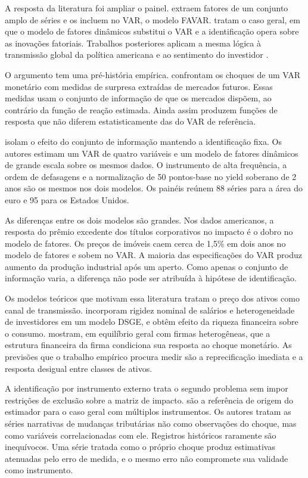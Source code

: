 \documentclass[preprint,authoryear,review,12pt]{elsarticle}
\begin{document}
A resposta da literatura foi ampliar o painel. \cite{bernanke} extraem fatores de um conjunto amplo de séries e os incluem no VAR, o modelo FAVAR. \cite{STOCK2016415} tratam o caso geral, em que o modelo de fatores dinâmicos substitui o VAR e a identificação opera sobre as inovações fatoriais. Trabalhos posteriores aplicam a mesma lógica à transmissão global da política americana \cite{miranda} e ao sentimento do investidor \cite{lutz}.

O argumento tem uma pré-história empírica. \cite{bagliano1998} confrontam os choques de um VAR monetário com medidas de surpresa extraídas de mercados futuros. Essas medidas usam o conjunto de informação de que os mercados dispõem, ao contrário da função de reação estimada. Ainda assim produzem funções de resposta que não diferem estatisticamente das do VAR de referência.

\cite{alessi} isolam o efeito do conjunto de informação mantendo a identificação fixa. Os autores estimam um VAR de quatro variáveis e um modelo de fatores dinâmicos de grande escala sobre os mesmos dados. O instrumento de alta frequência, a ordem de defasagens e a normalização de 50 pontos-base no yield soberano de 2 anos são os mesmos nos dois modelos. Os painéis reúnem 88 séries para a área do euro e 95 para os Estados Unidos.

As diferenças entre os dois modelos são grandes. Nos dados americanos, a resposta do prêmio excedente dos títulos corporativos no impacto é o dobro no modelo de fatores. Os preços de imóveis caem cerca de 1,5\% em dois anos no modelo de fatores e sobem no VAR. A maioria das especificações do VAR produz aumento da produção industrial após um aperto. Como apenas o conjunto de informação varia, a diferença não pode ser atribuída à hipótese de identificação.

Os modelos teóricos que motivam essa literatura tratam o preço dos ativos como canal de transmissão. \cite{castelnuovo} incorporam rigidez nominal de salários e heterogeneidade de investidores em um modelo DSGE, e obtêm efeito da riqueza financeira sobre o consumo. \cite{Cooley} mostram, em equilíbrio geral com firmas heterogêneas, que a estrutura financeira da firma condiciona sua resposta ao choque monetário. As previsões que o trabalho empírico procura medir são a reprecificação imediata e a resposta desigual entre classes de ativos.

A identificação por instrumento externo trata o segundo problema sem impor restrições de exclusão sobre a matriz de impacto. \cite{mertensravn2013} são a referência de origem do estimador para o caso geral com múltiplos instrumentos. Os autores tratam as séries narrativas de mudanças tributárias não como observações do choque, mas como variáveis correlacionadas com ele. Registros históricos raramente são inequívocos. Uma série tratada como o próprio choque produz estimativas atenuadas pelo erro de medida, e o mesmo erro não compromete sua validade como instrumento.
\end{document}
